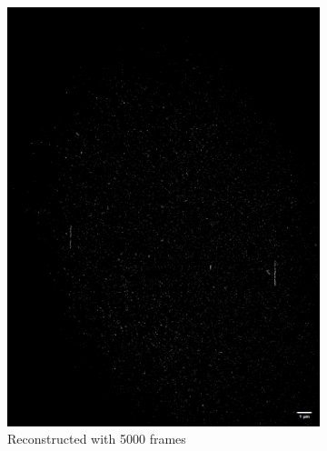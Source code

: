 \documentclass[a4paper,english,12pt,bibliography=totoc]{scrreprt}
\begin{document}
  \begin{figure}[hbpt]
    \centering
    \begin{subfigure}[b]{0.45\textwidth}
        \centering
        \includegraphics[width=\textwidth]{Images/STORM/5000frames.png}
        \caption{Reconstructed with 5000 frames}
        \label{fig:image1}
    \end{subfigure}
    \hfill
    \begin{subfigure}[b]{0.45\textwidth}
        \centering

\end{subfigure}
\end{figure}
\end{document}
